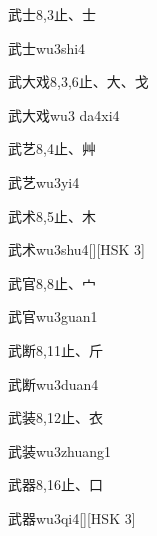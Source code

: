 \begin{entry}{武士}{8,3}{⽌、⼠}
  \begin{phonetics}{武士}{wu3shi4}
  \end{phonetics}
\end{entry}

\begin{entry}{武大戏}{8,3,6}{⽌、⼤、⼽}
  \begin{phonetics}{武大戏}{wu3 da4xi4}
  \end{phonetics}
\end{entry}

\begin{entry}{武艺}{8,4}{⽌、⾋}
  \begin{phonetics}{武艺}{wu3yi4}
  \end{phonetics}
\end{entry}

\begin{entry}{武术}{8,5}{⽌、⽊}
  \begin{phonetics}{武术}{wu3shu4}[][HSK 3]
  \end{phonetics}
\end{entry}

\begin{entry}{武官}{8,8}{⽌、⼧}
  \begin{phonetics}{武官}{wu3guan1}
  \end{phonetics}
\end{entry}

\begin{entry}{武断}{8,11}{⽌、⽄}
  \begin{phonetics}{武断}{wu3duan4}
  \end{phonetics}
\end{entry}

\begin{entry}{武装}{8,12}{⽌、⾐}
  \begin{phonetics}{武装}{wu3zhuang1}
  \end{phonetics}
\end{entry}

\begin{entry}{武器}{8,16}{⽌、⼝}
  \begin{phonetics}{武器}{wu3qi4}[][HSK 3]
  \end{phonetics}
\end{entry}

